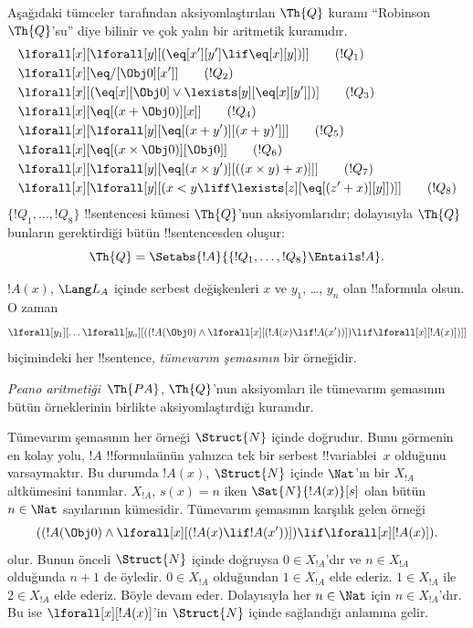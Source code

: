 \begin{defn}
Aşağıdaki tümceler tarafından aksiyomlaştırılan $\Th{Q}$ kuramı
``Robinson $\Th{Q}$'su'' diye bilinir ve çok yalın bir aritmetik kuramıdır.
\begin{align*}
& \lforall[x][\lforall[y][(\eq[x'][y'] \lif \eq[x][y])]] \tag{$!Q_1$}\\
& \lforall[x][\eq/[\Obj 0][x']] \tag{$!Q_2$}\\
& \lforall[x][(\eq[x][\Obj 0] \lor \lexists[y][\eq[x][y']])] \tag{$!Q_3$}\\
& \lforall[x][\eq[(x + \Obj 0)][x]] \tag{$!Q_4$}\\
& \lforall[x][\lforall[y][\eq[(x + y')][(x + y)']]] \tag{$!Q_5$}\\
& \lforall[x][\eq[(x \times \Obj 0)][\Obj 0]] \tag{$!Q_6$}\\
& \lforall[x][\lforall[y][\eq[(x \times y')][((x \times y) + x)]]] \tag{$!Q_7$}\\
& \lforall[x][\lforall[y][(x < y \liff \lexists[z][\eq[(z' + x)][y]])]] \tag{$!Q_8$}
\end{align*}
$\{!Q_1, \dots, !Q_8\}$ !!{sentence}s{}i kümesi $\Th{Q}$'nun
aksiyomlarıdır; dolayısıyla $\Th{Q}$ bunların gerektirdiği bütün
!!{sentence}s{}den oluşur:
\[
\Th{Q} = \Setabs{!A}{\{!Q_1, \dots, !Q_8\} \Entails !A}.
\]
\end{defn}

\begin{defn}
$!A(x)$, $\Lang L_A$ içinde serbest değişkenleri $x$ ve $y_1$, \dots,
$y_n$ olan !!a{formula} olsun. O zaman
\[
\lforall[y_1][\dots\lforall[y_n][((!A(\Obj 0) \land \lforall[x][(!A(x)
\lif !A(x'))]) \lif \lforall[x][!A(x)])]]
\]
biçimindeki her !!{sentence}, \emph{tümevarım şemasının} bir örneğidir.

\emph{Peano aritmetiği}~$\Th{PA}$, $\Th{Q}$'nun aksiyomları ile tümevarım
şemasının bütün örneklerinin birlikte aksiyomlaştırdığı kuramdır.
\end{defn}

\begin{explain}
Tümevarım şemasının her örneği $\Struct{N}$ içinde doğrudur. Bunu görmenin
en kolay yolu, $!A$ !!{formula}{}ünün yalnızca tek bir serbest
!!{variable}{}i~$x$ olduğunu varsaymaktır. Bu durumda $!A(x)$,
$\Struct{N}$ içinde $\Nat$'ın bir $X_{!A}$ altkümesini tanımlar.
$X_{!A}$, $s(x) = n$ iken $\Sat{N}{!A(x)}[s]$ olan bütün $n \in \Nat$
sayılarının kümesidir. Tümevarım şemasının karşılık gelen örneği
\[
((!A(\Obj 0) \land \lforall[x][(!A(x) \lif !A(x'))]) \lif 
  \lforall[x][!A(x)]).
\]
olur. Bunun önceli $\Struct{N}$ içinde doğruysa $0 \in X_{!A}$'dır ve
$n \in X_{!A}$ olduğunda $n+1$ de öyledir. $0 \in X_{!A}$
olduğundan $1 \in X_{!A}$ elde ederiz. $1 \in X_{!A}$ ile $2 \in X_{!A}$
elde ederiz. Böyle devam eder. Dolayısıyla her $n \in \Nat$ için
$n \in X_{!A}$'dır. Bu ise $\lforall[x][!A(x)]$'in $\Struct{N}$ içinde
sağlandığı anlamına gelir.
\end{explain}

